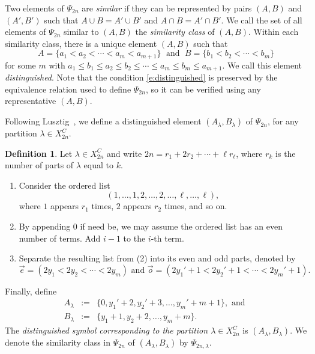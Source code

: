 \documentclass[reqno,11pt]{amsart}
\theoremstyle{remark}
\theoremstyle{remark}
\theoremstyle{definition}
\theoremstyle{definition}
\theoremstyle{definition}
\newtheorem{Def}[Thm]{Definition}
\numberwithin{equation}{section}
\begin{document}
Two elements of $\Psi_{2n}$ are \emph{similar} if they can be represented by pairs $(A,B)$ and $(A',B')$ such that
$A\cup B=A'\cup B'$ and $A\cap B=A'\cap B'$. We call the set of all elements of $\Psi_{2n}$ similar to $(A,B)$ the \emph{similarity class} of $(A,B)$. Within each similarity class, there is a unique element 
$(A,B)$ such that 
\begin{equation} \label{e:distinguished}
A=\{a_1<a_2< \cdots<a_m<a_{m+1}\} \; \text{ and } \; B=\{b_1<b_2<\cdots < b_m\}
\end{equation}
for some $m$ with $a_1\leq b_1\leq a_2\leq b_2\leq \cdots \leq a_m \leq b_m \leq a_{m+1}$.  
We call this element \emph{distinguished}.  Note that the condition \eqref{e:distinguished}
is preserved by the equivalence relation used to define $\Psi_{2n}$, so it can be verified using any
representative $(A,B)$.

Following Lusztig~\cite[\S 11.6]{Lu84}, we define a distinguished element $(A_\lambda, B_\lambda)$ of $\Psi_{2n}$, for any partition $\lambda\in X_{2n}^C$.  

\begin{Def} Let $\lambda\in X_{2n}^C$ and write $2n = r_1+2r_2+\cdots + \ell r_\ell$, where $r_k$ is the number of parts of $\lambda$ equal to $k$.
\begin{enumerate}
\item Consider the ordered list
\[
(1,\ldots, 1, 2, \ldots, 2, \ldots, \ell, \ldots, \ell),
\]
where $1$ appears $r_1$ times, $2$ appears $r_2$ times, and so on.  
\item By appending $0$ if need be, we may assume the ordered list has an even number of terms.  Add $i-1$ to the $i$-th term.
\item Separate the resulting list from (2) into its even and odd parts, denoted by 
\[
\vec{e} = (2y_1<2y_2<\cdots < 2y_m) \text{ and } \vec{o} = (2y_1'+1< 2y_2'+1<\cdots < 2y_m'+1).
\]
\end{enumerate}
Finally, define 
\begin{eqnarray*}
A_\lambda &:=& \{0, y_1'+2, y_2'+3, \ldots, y_m'+m+1 \}, \text{ and } \\
 B_\lambda &:=& \{y_1+1, y_2+2, \ldots, y_m+m\}.
\end{eqnarray*}
The \emph{distinguished symbol corresponding to the partition $\lambda \in X_{2n}^C$} is $(A_\lambda, B_\lambda)$. We denote the similarity class in $\Psi_{2n}$ of $(A_\lambda, B_{\lambda})$ by $\Psi_{2n, \lambda}$.
\end{Def}
\end{document}
